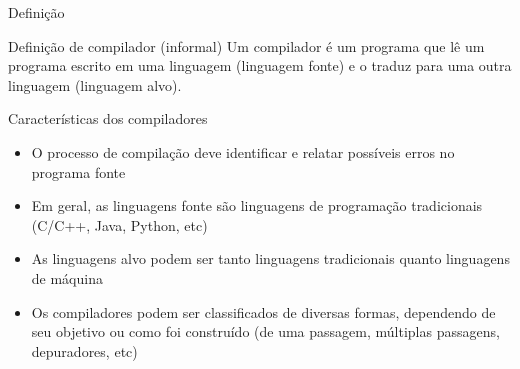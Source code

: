 \begin{frame}[fragile]{Definição}

    \begin{block}{Definição de compilador (informal)}
        Um compilador é um programa que lê um programa escrito em uma linguagem (linguagem fonte) e o traduz para uma outra linguagem (linguagem alvo).
    \end{block}


    \vspace{0.2in}

    \begin{center}
    \end{center}

\end{frame}

\begin{frame}[fragile]{Características dos compiladores}

    \begin{itemize}
        \item O processo de compilação deve identificar e relatar possíveis erros no programa fonte

        \item Em geral, as linguagens fonte são linguagens de programação tradicionais (C/C++, Java, Python, etc)

        \item As linguagens alvo podem ser tanto linguagens tradicionais quanto linguagens de máquina

        \item Os compiladores podem ser classificados de diversas formas, dependendo de seu objetivo ou como foi construído (de uma passagem, múltiplas passagens,
            depuradores, etc)
    \end{itemize}

\end{frame}


